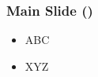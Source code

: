 \documentclass{beamer}
\def\insertcont{%
  \pgfmathparse{\insertpagenumber-\insertframestartpage+1}%
  (\pgfmathprintnumber{\pgfmathresult})%
}
\begin{document}
    \begin{frame}
        \frametitle{Main Slide \insertcont}
        \begin{itemize} 
            \item ABC \only<2->{\footfullcite{Tuchler2002}}
            \item XYZ 
        \end{itemize}
    \end{frame}
\end{document}

